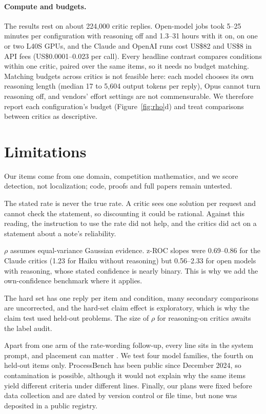 \documentclass[letterpaper]{article} %
\begin{document}
\paragraph{Compute and budgets.} The results rest on about 224,000 critic replies. Open-model jobs took 5--25 minutes per configuration with reasoning off and 1.3--31 hours with it on, on one or two L40S GPUs, and the Claude and OpenAI runs cost US\$82 and US\$8 in API fees (US\$0.0001--0.023 per call). Every headline contrast compares conditions within one critic, paired over the same items, so it needs no budget matching. Matching budgets across critics is not feasible here: each model chooses its own reasoning length (median 17 to 5,604 output tokens per reply), Opus cannot turn reasoning off, and vendors' effort settings are not commensurable. We therefore report each configuration's budget (Figure~\ref{fig:rho}d) and treat comparisons between critics as descriptive.

\section{Limitations}

Our items come from one domain, competition mathematics, and we score detection, not localization; code, proofs and full papers remain untested.

The stated rate is never the true rate. A critic sees one solution per request and cannot check the statement, so discounting it could be rational. Against this reading, the instruction to use the rate did not help, and the critics did act on a statement about a note's reliability.

$\rho$ assumes equal-variance Gaussian evidence. z-ROC slopes were 0.69--0.86 for the Claude critics (1.23 for Haiku without reasoning) but 0.56--2.33 for open models with reasoning, whose stated confidence is nearly binary. This is why we add the own-confidence benchmark where it applies.

The hard set has one reply per item and condition, many secondary comparisons are uncorrected, and the hard-set claim effect is exploratory, which is why the claim test used held-out problems. The size of $\rho$ for reasoning-on critics awaits the label audit.

Apart from one arm of the rate-wording follow-up, every line sits in the system prompt, and placement can matter \citep{brown2026grounded,ni2026position}. We test four model families, the fourth on held-out items only. ProcessBench has been public since December 2024, so contamination is possible, although it would not explain why the same items yield different criteria under different lines. Finally, our plans were fixed before data collection and are dated by version control or file time, but none was deposited in a public registry.
\end{document}

